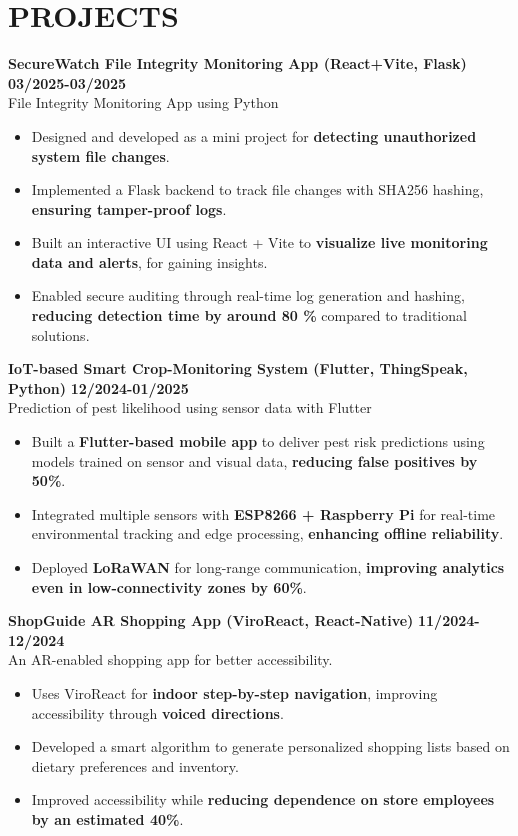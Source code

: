 \documentclass[10pt, letterpaper]{article} %
\begin{document}
\section*{PROJECTS}
\textbf{SecureWatch File Integrity Monitoring App (React+Vite, Flask)} \hfill \textbf{03/2025-03/2025} \\
File Integrity Monitoring App using Python
\begin{itemize}
    \item Designed and developed as a mini project for \textbf{detecting unauthorized system file changes}.
    \item Implemented a Flask backend to track file changes with SHA256 hashing, \textbf{ensuring tamper-proof logs}.
    \item Built an interactive UI using React + Vite to \textbf{visualize live monitoring data and alerts}, for gaining insights.
    \item Enabled secure auditing through real-time log generation and hashing, \textbf{reducing detection time by around 80 \%} compared to traditional solutions.
\end{itemize}

\vspace{0.85em} %
\textbf{IoT-based Smart Crop-Monitoring System (Flutter, ThingSpeak, Python)} \hfill \textbf{12/2024-01/2025} \\
Prediction of pest likelihood using sensor data with Flutter
\begin{itemize}
    \item Built a \textbf{Flutter-based mobile app} to deliver pest risk predictions using models trained on sensor and visual data, \textbf{reducing false positives by 50\%}.
    \item Integrated multiple sensors with \textbf{ESP8266 + Raspberry Pi} for real-time environmental tracking and edge processing, \textbf{enhancing offline reliability}. 
    \item Deployed \textbf{LoRaWAN} for long-range communication, \textbf{improving analytics even in low-connectivity zones by 60\%}. 
\end{itemize}

\vspace{0.85em} %
\textbf{ShopGuide AR Shopping App (ViroReact, React-Native)} \hfill \textbf{11/2024-12/2024} \\
An AR-enabled shopping app for better accessibility.
\begin{itemize}
    \item Uses ViroReact for \textbf{indoor step-by-step navigation}, improving accessibility through \textbf{voiced directions}.
    \item Developed a smart algorithm to generate personalized shopping lists based on dietary preferences and inventory. 
    \item Improved accessibility while \textbf{reducing dependence on store employees by an estimated 40\%}.
\end{itemize}
\end{document}
